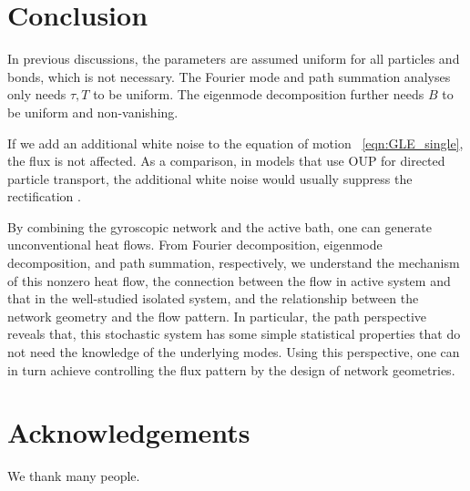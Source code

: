 \documentclass[
 preprint,
 preprintnumbers,
 amsmath,amssymb,
 aps,
 pre,
 longbibliography,
 10pt, twocolumn
]{revtex4-1}
\begin{document}
\section{Conclusion} \label{sec:conclusion}

In previous discussions, the parameters are assumed uniform for all particles and bonds, which is not necessary.
The Fourier mode and path summation analyses only needs $\tau,T$ to be uniform. The eigenmode decomposition further needs $B$ to be uniform and non-vanishing.

If we add an additional white noise to the equation of motion \eqnname~\eqref{eqn:GLE_single}, the flux is not affected. As a comparison, in models that use OUP for directed particle transport, the additional white noise would usually suppress the rectification \cite{Bartussek1996PreciseRatchets}.

By combining the gyroscopic network and the active bath, one can generate unconventional heat flows. 
From Fourier decomposition, eigenmode decomposition, and path summation, respectively, we understand the mechanism of this nonzero heat flow, the connection between the flow in active system and that in the well-studied isolated system, and the relationship between the network geometry and the flow pattern.
In particular, the path perspective reveals that, this stochastic system has some simple statistical properties that do not need the knowledge of the underlying modes. Using this perspective, one can in turn achieve controlling the flux pattern by the design of network geometries.


\section*{Acknowledgements}
We thank many people.



\end{document}
